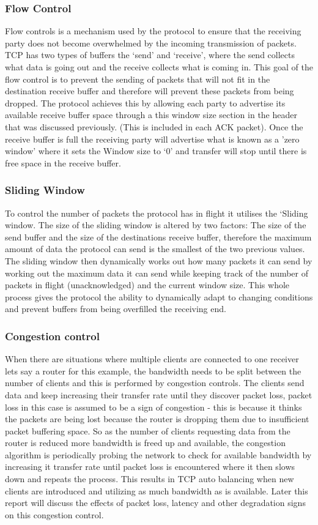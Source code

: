 \subsubsection*{Flow Control}
Flow controls is a mechanism used by the protocol to ensure that the receiving party does not become overwhelmed by the incoming transmission of packets. TCP has two types of buffers the `send' and `receive', where the send collects what data is going out and the receive collects what is coming in. This goal of the flow control is to prevent the sending of packets that will not fit in the destination receive buffer and therefore will prevent these packets from being dropped. The protocol achieves this by allowing each party to advertise its available receive buffer space through a this window size section in the header that was discussed previously. (This is included in each ACK packet). Once the receive buffer is full the receiving party will advertise what is known as a 'zero window' where it sets the Window size to `0' and transfer will stop until there is free space in the receive buffer.

\subsubsection*{Sliding Window}
To control the number of packets the protocol has in flight it utilises the `Sliding window. The size of the sliding window is altered by two factors: The size of the send buffer and the size of the destinations receive buffer, therefore the maximum amount of data the protocol can send is the smallest of the two previous values. The sliding window then dynamically works out how many packets it can send by working out the maximum data it can send while keeping track of the number of packets in flight (unacknowledged) and the current window size. This whole process gives the protocol the ability to dynamically adapt to changing conditions and prevent buffers from being overfilled the receiving end.


\subsubsection*{Congestion control}
When there are situations where multiple clients are connected to one receiver lets say a router for this example, the bandwidth needs to be split between the number of clients and this is performed by congestion controls. The clients send data and keep increasing their transfer rate until they discover packet loss, packet loss in this case is assumed to be a sign of congestion - this is because it thinks the packets are being lost because the router is dropping them due to insufficient packet buffering space. So as the number of clients requesting data from the router is reduced more bandwidth is freed up and available, the congestion algorithm is periodically probing the network to check for available bandwidth by increasing it transfer rate until packet loss is encountered where it then slows down and repeats the process. This results in TCP auto balancing when new clients are introduced and utilizing as much bandwidth as is available. Later this report will discuss the effects of packet loss, latency and other degradation signs on this congestion control.

